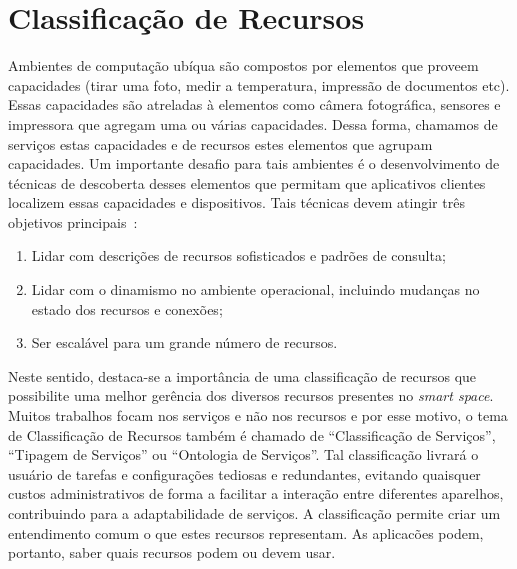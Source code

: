 \chapter{Classificação de Recursos}

Ambientes de computação ubíqua são compostos por elementos que proveem capacidades (tirar uma foto, medir a temperatura, impressão de documentos etc). Essas capacidades são atreladas à elementos como câmera fotográfica, sensores e impressora que agregam uma ou várias capacidades. Dessa forma, chamamos de serviços estas capacidades e de recursos estes elementos que agrupam capacidades. Um importante desafio para tais ambientes é o desenvolvimento de técnicas de descoberta desses elementos que permitam que aplicativos clientes localizem essas capacidades e dispositivos. Tais técnicas devem atingir três objetivos principais~\cite{balazinska2002ins/twine}:

\begin{enumerate}
	\item Lidar com descrições de recursos sofisticados e padrões de consulta;
	\item Lidar com o dinamismo no ambiente operacional, incluindo mudanças no estado dos recursos e conexões;
	\item Ser escalável para um grande número de recursos.
\end{enumerate}

Neste sentido, destaca-se a importância de uma classificação de recursos que possibilite uma melhor gerência dos diversos recursos presentes no \emph{smart space}. Muitos trabalhos focam nos serviços e não nos recursos e por esse motivo, o tema de Classificação de Recursos também é chamado de ``Classificação de Serviços'', ``Tipagem de Serviços'' ou ``Ontologia de Serviços''. Tal classificação livrará o usuário de tarefas e configurações tediosas e redundantes, evitando quaisquer custos administrativos de forma a facilitar a interação entre diferentes aparelhos, contribuindo para a adaptabilidade de serviços. A classificação permite criar um entendimento comum o que estes recursos representam. As aplicacões podem, portanto, saber quais recursos podem ou devem usar.

